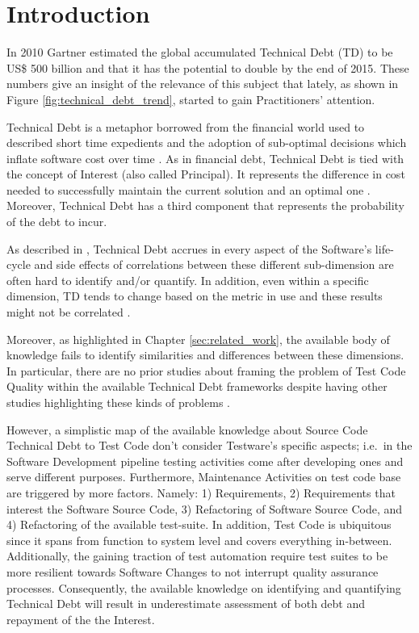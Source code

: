 
\chapter{Introduction} \label{sec:introduction}

In 2010 Gartner estimated the global accumulated Technical Debt (TD) to be US\$ 500 billion \cite{costOfTechnicalDebt} and that it has the potential to double by the end of 2015. These numbers give an insight of the relevance of this subject that lately, as shown in Figure \ref{fig:technical_debt_trend}, started to gain Practitioners' attention.

Technical Debt is a metaphor borrowed from the financial world used to described short time expedients and the adoption of sub-optimal decisions which inflate software cost over time \cite{first_mention_of_TD}. As in financial debt, Technical Debt is tied with the concept of Interest (also called Principal). It represents the difference in cost needed to successfully maintain the current solution and an optimal one \cite{technicalDebtInterest}. Moreover, Technical Debt has a third component that represents the probability of the debt to incur.

As described in \cite{mapping_study_td, exploration_of_td, exploration_of_td2}, Technical Debt accrues in every aspect of the Software's life-cycle and side effects of correlations between these different sub-dimension are often hard to identify and/or quantify. In addition, even within a specific dimension, TD tends to change based on the metric in use and these results might not be correlated \cite{4_methods_to_identify_td}.

Moreover, as highlighted in Chapter \ref{sec:related_work}, the available body of knowledge fails to identify similarities and differences between these dimensions. In particular, there are no prior studies about framing the problem of Test Code Quality within the available Technical Debt frameworks despite having other studies highlighting these kinds of problems \cite{gui_scripts_bad_smells,pitfalls_in_introducing_regression_testing}.

However, a simplistic map of the available knowledge about Source Code Technical Debt to Test Code don't consider Testware's specific aspects; i.e.\ in the Software Development pipeline testing activities come after developing ones and serve different purposes. Furthermore, Maintenance Activities on test code base are triggered by more factors. Namely: 1) Requirements, 2) Requirements that interest the Software Source Code, 3) Refactoring of Software Source Code, and 4) Refactoring of the available test-suite. In addition, Test Code is ubiquitous since it spans from function to system level and covers everything in-between. Additionally, the gaining traction of test automation require test suites to be more resilient towards Software Changes to not interrupt quality assurance processes. Consequently, the available knowledge on identifying and quantifying Technical Debt will result in underestimate assessment of both debt and repayment of the the Interest.

